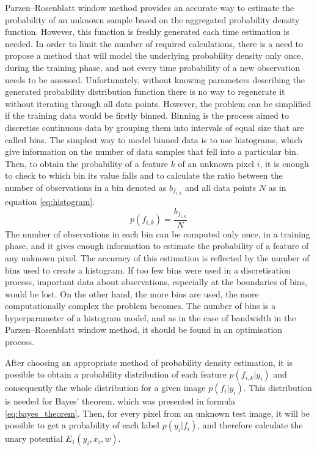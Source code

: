 Parzen–Rosenblatt window method provides an accurate way to estimate the probability of an unknown sample based on the aggregated probability density function. However, this function is freshly generated each time estimation is needed. In order to limit the number of required calculations, there is a need to propose a method that will model the underlying probability density only once, during the training phase, and not every time probability of a new observation needs to be assessed. Unfortunately, without knowing parameters describing the generated probability distribution function there is no way to regenerate it without iterating through all data points. However, the problem can be simplified if the training data would be firstly binned. Binning is the process aimed to discretise continuous data by grouping them into intervals of equal size that are called bins. The simplest way to model binned data is to use histograms, which give information on the number of data samples that fell into a particular bin. Then, to obtain the probability of a feature $k$ of an unknown pixel $i$, it is enough to check to which bin its value falls and to calculate the ratio between the number of observations in a bin denoted as $b_{f_{i,k}}$ and all data points $N$ as in equation \ref{eq:histogram}.
\begin{equation}
    \label{eq:histogram}
    p(f_{i,k}) = \frac{b_{f_{i,k}}}{N}
\end{equation}
The number of observations in each bin can be computed only once, in a training phase, and it gives enough information to estimate the probability of a feature of any unknown pixel. The accuracy of this estimation is reflected by the number of bins used to create a histogram. If too few bins were used in a discretisation process, important data about observations, especially at the boundaries of bins, would be lost. On the other hand, the more bins are used, the more computationally complex the problem becomes. The number of bins is a hyperparameter of a histogram model, and as in the case of bandwidth in the Parzen–Rosenblatt window method, it should be found in an optimisation process.

After choosing an appropriate method of probability density estimation, it is possible to obtain a probability distribution of each feature $p(f_{i,k} | y_i)$ and consequently the whole distribution for a given image $p(f_i | y_i)$. This distribution is needed for Bayes' theorem, which was presented in formula \ref{eq:bayes_theorem}. Then, for every pixel from an unknown test image, it will be possible to get a probability of each label $p(y_i | f_i)$, and therefore calculate the unary potential $E_1(y_i,x_i,w)$.

